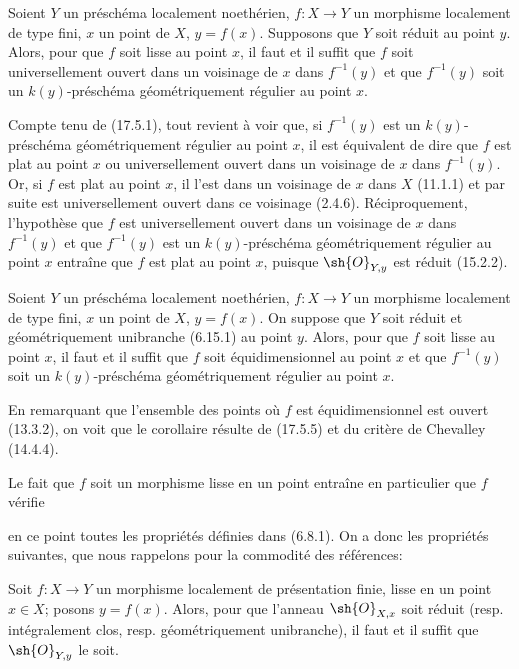 \begin{proposition}[17.5.5]
\label{IV.17.5.5}
Soient $Y$ un préschéma localement noethérien, $f:X\to Y$ un morphisme localement de type fini, $x$ un point de $X$, $y=f(x)$. Supposons que $Y$ soit réduit au point $y$. Alors, pour que $f$ soit lisse au point $x$, il faut et il suffit que $f$ soit universellement ouvert dans un voisinage de $x$ dans $f^{-1}(y)$ et que $f^{-1}(y)$ soit un $k(y)$-préschéma géométriquement régulier au point $x$.
\end{proposition}

Compte tenu de (17.5.1), tout revient à voir que, si $f^{-1}(y)$ est un $k(y)$-préschéma géométriquement régulier au point $x$, il est équivalent de dire que $f$ est plat au point $x$ ou universellement ouvert dans un voisinage de $x$ dans $f^{-1}(y)$. Or, si $f$ est plat au point $x$, il l'est dans un voisinage de $x$ dans $X$ (11.1.1) et par suite est universellement ouvert dans ce voisinage (2.4.6). Réciproquement, l'hypothèse que $f$ est universellement ouvert dans un voisinage de $x$ dans $f^{-1}(y)$ et que $f^{-1}(y)$ est un $k(y)$-préschéma géométriquement régulier au point $x$ entraîne que $f$ est plat au point $x$, puisque $\sh{O}_{Y,y}$ est réduit (15.2.2).

\begin{corollary}[17.5.6]
\label{IV.17.5.6}
Soient $Y$ un préschéma localement noethérien, $f:X\to Y$ un morphisme localement de type fini, $x$ un point de $X$, $y=f(x)$. On suppose que $Y$ soit réduit et géométriquement unibranche (6.15.1) au point $y$. Alors, pour que $f$ soit lisse au point $x$, il faut et il suffit que $f$ soit équidimensionnel au point $x$ et que $f^{-1}(y)$ soit un $k(y)$-préschéma géométriquement régulier au point $x$.
\end{corollary}

En remarquant que l'ensemble des points où $f$ est équidimensionnel est ouvert (13.3.2), on voit que le corollaire résulte de (17.5.5) et du critère de Chevalley (14.4.4).

Le fait que $f$ soit un morphisme lisse en un point entraîne en particulier que $f$ vérifie

en ce point toutes les propriétés définies dans (6.8.1). On a donc les propriétés suivantes, que nous rappelons pour la commodité des références:

\begin{proposition}[17.5.7]
\label{IV.17.5.7}
Soit $f:X\to Y$ un morphisme localement de présentation finie, lisse en un point $x\in X$; posons $y=f(x)$. Alors, pour que l'anneau $\sh{O}_{X,x}$ soit réduit (resp. intégralement clos, resp. géométriquement unibranche), il faut et il suffit que $\sh{O}_{Y,y}$ le soit.
\end{proposition}

